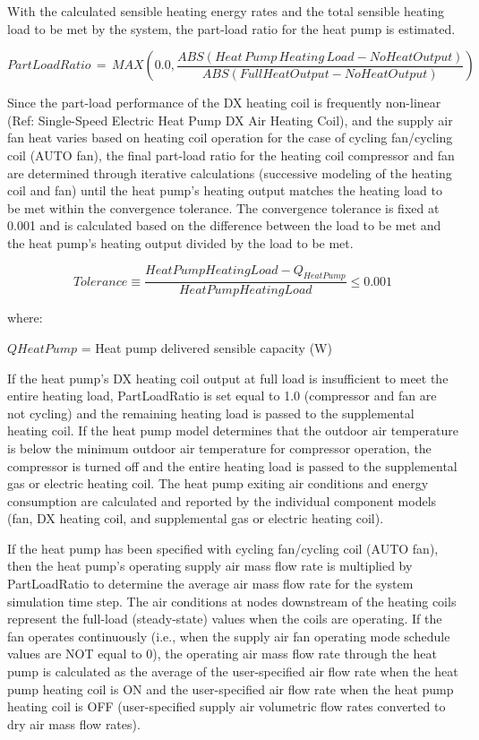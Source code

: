 With the calculated sensible heating energy rates and the total sensible heating load to be met by the system, the part-load ratio for the heat pump is estimated.

\begin{equation}
PartLoadRatio\, = \,MAX\left( {0.0,\frac{{ABS\left( {Heat\,Pump\,Heating\,Load - NoHeatOutput} \right)}}{{ABS\left( {FullHeatOutput - NoHeatOutput} \right)}}} \right)
\end{equation}

Since the part-load performance of the DX heating coil is frequently non-linear (Ref: Single-Speed Electric Heat Pump DX Air Heating Coil), and the supply air fan heat varies based on heating coil operation for the case of cycling fan/cycling coil (AUTO fan), the final part-load ratio for the heating coil compressor and fan are determined through iterative calculations (successive modeling of the heating coil and fan) until the heat pump's heating output matches the heating load to be met within the convergence tolerance. The convergence tolerance is fixed at 0.001 and is calculated based on the difference between the load to be met and the heat pump's heating output divided by the load to be met.

\begin{equation}
  Tolerance \equiv \frac{HeatPumpHeatingLoad - Q_{HeatPump}}{HeatPumpHeatingLoad} \leq 0.001
\end{equation}

where:

\(QHeatPump\) = Heat pump delivered sensible capacity (W)

If the heat pump's DX heating coil output at full load is insufficient to meet the entire heating load, PartLoadRatio is set equal to 1.0 (compressor and fan are not cycling) and the remaining heating load is passed to the supplemental heating coil. If the heat pump model determines that the outdoor air temperature is below the minimum outdoor air temperature for compressor operation, the compressor is turned off and the entire heating load is passed to the supplemental gas or electric heating coil. The heat pump exiting air conditions and energy consumption are calculated and reported by the individual component models (fan, DX heating coil, and supplemental gas or electric heating coil).

If the heat pump has been specified with cycling fan/cycling coil (AUTO fan), then the heat pump's operating supply air mass flow rate is multiplied by PartLoadRatio to determine the average air mass flow rate for the system simulation time step. The air conditions at nodes downstream of the heating coils represent the full-load (steady-state) values when the coils are operating. If the fan operates continuously (i.e., when the supply air fan operating mode schedule values are NOT equal to 0), the operating air mass flow rate through the heat pump is calculated as the average of the user-specified air flow rate when the heat pump heating coil is ON and the user-specified air flow rate when the heat pump heating coil is OFF (user-specified supply air volumetric flow rates converted to dry air mass flow rates).

